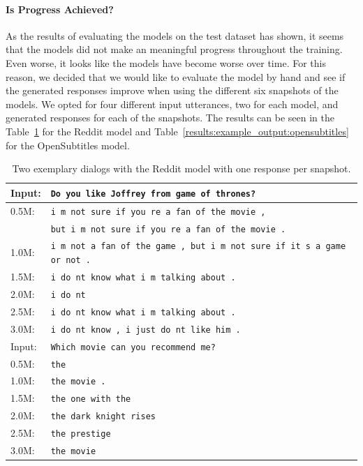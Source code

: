 \paragraph{Is Progress Achieved?} As the results of evaluating the models on the test dataset has shown, it seems that the models did not make an meaningful progress throughout the training. Even worse, it looks like the models have become worse over time. For this reason, we decided that we would like to evaluate the model by hand and see if the generated responses improve when using the different six snapshots of the models. We opted for four different input utterances, two for each model, and generated responses for each of the snapshots. The results can be seen in the Table~\ref{results:example_output:reddit} for the Reddit model and Table~\ref{results:example_output:opensubtitles} for the OpenSubtitles model.

\begin{table}[H]
	\centering
	\begin{adjustbox}{max width=\textwidth}
		\begin{tabular}{ll}
			\toprule
			Input: 	& \texttt{Do you like Joffrey from game of thrones?}\\
			\midrule
			0.5M: 	& \texttt{i m not sure if you re a fan of the movie ,}\\
			& \texttt{but i m not sure if you re a fan of the movie .}\\
			1.0M: 	& \texttt{i m not a fan of the game , but i m not sure if it s a game or not .}\\
			1.5M:	& \texttt{i do nt know what i m talking about .}\\
			2.0M:	& \texttt{i do nt }\\
			2.5M:	& \texttt{i do nt know what i m talking about .}\\
			3.0M:	& \texttt{i do nt know , i just do nt like him .}\\
			\midrule
			Input: 	& \texttt{Which movie can you recommend me?}\\
			\midrule
			0.5M: 	& \texttt{the}\\
			1.0M: 	& \texttt{the movie .}\\
			1.5M:	& \texttt{the one with the}\\
			2.0M:	& \texttt{the dark knight rises}\\
			2.5M:	& \texttt{the prestige}\\
			3.0M:	& \texttt{the movie}\\
			\bottomrule
		\end{tabular}
	\end{adjustbox}
	\caption{Two exemplary dialogs with the Reddit model with one response per snapshot.}
	\label{results:example_output:reddit}
\end{table}

